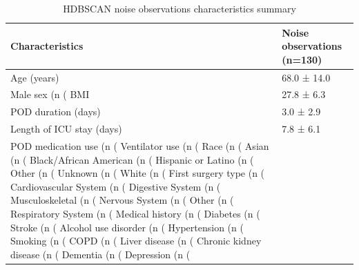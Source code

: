 \begin{table}

\caption{HDBSCAN noise observations characteristics summary}
\centering
\begin{tabular}[t]{ll}
\toprule
Characteristics & Noise observations (n=130)\\
\midrule
Age (years) & 68.0 ± 14.0\\
Male sex (n (%
BMI & 27.8 ± 6.3\\
POD duration (days) & 3.0 ± 2.9\\
Length of ICU stay (days) & 7.8 ± 6.1\\
\addlinespace
POD medication use (n (%
Ventilator use (n (%
Race (n (%
Asian (n (%
Black/African American (n (%
\addlinespace
Hispanic or Latino (n (%
Other (n (%
Unknown (n (%
White (n (%
First surgery type (n (%
\addlinespace
Cardiovascular System (n (%
Digestive System (n (%
Musculoskeletal (n (%
Nervous System (n (%
Other (n (%
\addlinespace
Respiratory System (n (%
Medical history (n (%
Diabetes (n (%
Stroke (n (%
Alcohol use disorder (n (%
\addlinespace
Hypertension (n (%
Smoking (n (%
COPD (n (%
Liver disease (n (%
Chronic kidney disease (n (%
\addlinespace
Dementia (n (%
Depression (n (%
\bottomrule
\end{tabular}
\end{table}
